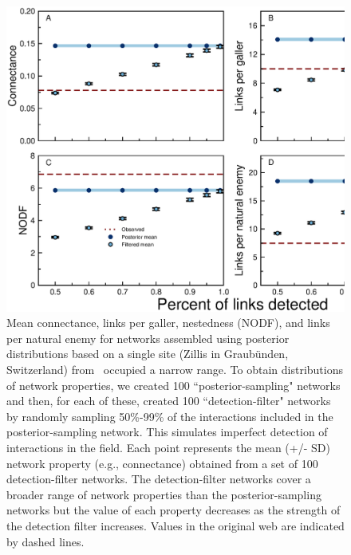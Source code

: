 \documentclass[12pt]{article}
\begin{document}
  \begin{figure}[h!]
    \caption{Mean connectance, links per galler, nestedness (NODF), and links per natural enemy for networks assembled using posterior distributions based on a single site (Zillis in Graub\"{u}nden, Switzerland) from~\citet{Kopelke2017} occupied a narrow range. To obtain distributions of network properties, we created 100 ``posterior-sampling" networks and then, for each of these, created 100 ``detection-filter" networks by randomly sampling 50\%-99\% of the interactions included in the posterior-sampling network. This simulates imperfect detection of interactions in the field. Each point represents the mean (+/- SD) network property (e.g., connectance) obtained from a set of 100 detection-filter networks. The detection-filter networks cover a broader range of network properties than the posterior-sampling networks but the value of each property decreases as the strength of the detection filter increases. Values in the original web are indicated by dashed lines.}
    \label{posterior_webs}    
    \begin{center}
    \includegraphics[width=.8\textwidth]{figures/GP_posterior_properties_Zillis.eps}
    \end{center}
    \end{figure}


\clearpage

     
\end{document}
